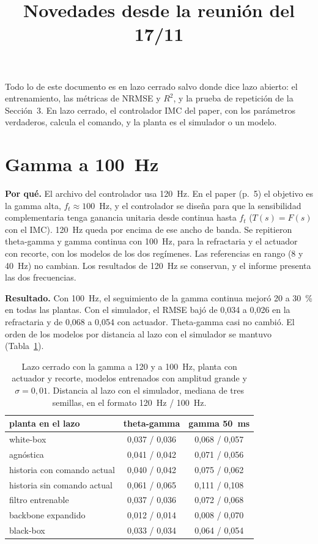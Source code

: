 \documentclass[11pt,a4paper]{article}
\title{Novedades desde la reunión del 17/11}
\author{}
\date{}
\begin{document}
\maketitle
\vspace{-14mm}

Todo lo de este documento es en lazo cerrado salvo donde dice lazo abierto: el entrenamiento, las métricas de NRMSE y $R^2$, y la prueba de repetición de la Sección~3. En lazo cerrado, el controlador IMC del paper, con los parámetros verdaderos, calcula el comando, y la planta es el simulador o un modelo.

\section{Gamma a 100~Hz}

\textbf{Por qué.} El archivo del controlador usa 120~Hz. En el paper (p.~5) el objetivo es la gamma alta, $f_t \approx 100$~Hz, y el controlador se diseña para que la sensibilidad complementaria tenga ganancia unitaria desde continua hasta $f_t$ ($T(s) = F(s)$ con el IMC). 120~Hz queda por encima de ese ancho de banda. Se repitieron theta-gamma y gamma continua con 100~Hz, para la refractaria y el actuador con recorte, con los modelos de los dos regímenes. Las referencias en rango (8 y 40~Hz) no cambian. Los resultados de 120~Hz se conservan, y el informe presenta las dos frecuencias.

\textbf{Resultado.} Con 100~Hz, el seguimiento de la gamma continua mejoró 20 a 30~\% en todas las plantas. Con el simulador, el RMSE bajó de 0,034 a 0,026 en la refractaria y de 0,068 a 0,054 con actuador. Theta-gamma casi no cambió. El orden de los modelos por distancia al lazo con el simulador se mantuvo (Tabla~\ref{tab:100}).

\begin{table}[H]
\centering
\small
\caption{Lazo cerrado con la gamma a 120 y a 100~Hz, planta con actuador y recorte, modelos entrenados con amplitud grande y $\sigma = 0{,}01$. Distancia al lazo con el simulador, mediana de tres semillas, en el formato 120~Hz / 100~Hz.}
\label{tab:100}
\begin{tabular}{@{}lcc@{}}
\toprule
planta en el lazo & theta-gamma & gamma 50~ms \\
\midrule
white-box & 0,037 / 0,036 & 0,068 / 0,057 \\
agnóstica & 0,041 / 0,042 & 0,071 / 0,056 \\
historia con comando actual & 0,040 / 0,042 & 0,075 / 0,062 \\
historia sin comando actual & 0,061 / 0,065 & 0,111 / 0,108 \\
filtro entrenable & 0,037 / 0,036 & 0,072 / 0,068 \\
backbone expandido & 0,012 / 0,014 & 0,008 / 0,070 \\
black-box & 0,033 / 0,034 & 0,064 / 0,054 \\
\bottomrule
\end{tabular}
\end{table}
\end{document}
